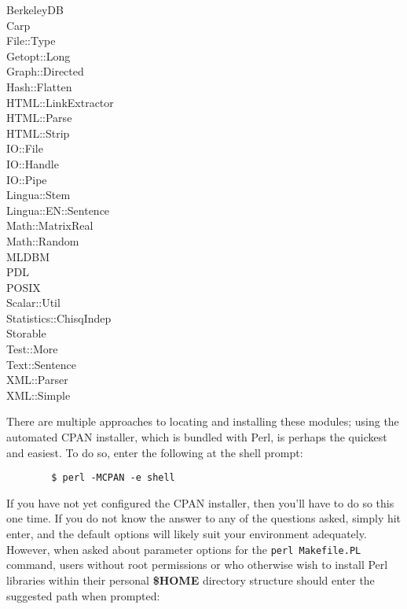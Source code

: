 \begin{description}

\item[{BerkeleyDB}] \mbox{}
\item[{Carp}] \mbox{}
\item[{File::Type}] \mbox{}
\item[{Getopt::Long}] \mbox{}
\item[{Graph::Directed}] \mbox{}
\item[{Hash::Flatten}] \mbox{}
\item[{HTML::LinkExtractor}] \mbox{}
\item[{HTML::Parse}] \mbox{}
\item[{HTML::Strip}] \mbox{}
\item[{IO::File}] \mbox{}
\item[{IO::Handle}] \mbox{}
\item[{IO::Pipe}] \mbox{}
\item[{Lingua::Stem}] \mbox{}
\item[{Lingua::EN::Sentence}] \mbox{}
\item[{Math::MatrixReal}] \mbox{}
\item[{Math::Random}] \mbox{}
\item[{MLDBM}] \mbox{}
\item[{PDL}] \mbox{}
\item[{POSIX}] \mbox{}
\item[{Scalar::Util}] \mbox{}
\item[{Statistics::ChisqIndep}] \mbox{}
\item[{Storable}] \mbox{}
\item[{Test::More}] \mbox{}
\item[{Text::Sentence}] \mbox{}
\item[{XML::Parser}] \mbox{}
\item[{XML::Simple}] \mbox{}\end{description}


There are multiple approaches to locating and installing these modules; using the automated CPAN installer, which is bundled with Perl, is perhaps the quickest and easiest. To do so, enter the following at the shell prompt:

\begin{verbatim}
        $ perl -MCPAN -e shell
\end{verbatim}


If you have not yet configured the CPAN installer, then you'll have to do so this one time. If you do not know the answer to any of the questions asked, simply hit enter, and the default options will likely suit your environment adequately. However, when asked about parameter options for the \texttt{perl Makefile.PL} command, users without root permissions or who otherwise wish to install Perl libraries within their personal \textbf{\$HOME} directory structure should enter the suggested path when prompted:

